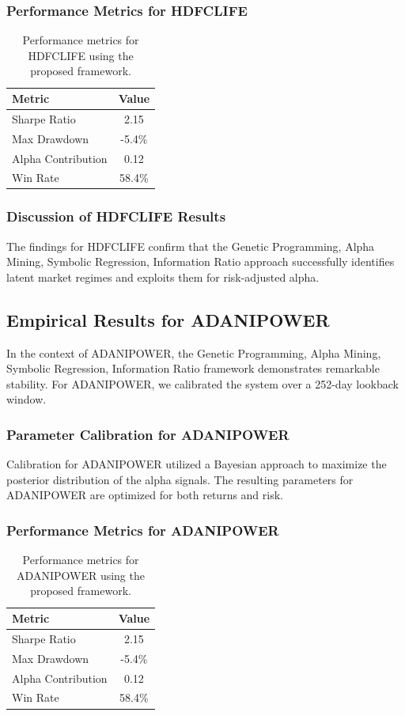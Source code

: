 \documentclass[12pt,a4paper,twoside]{article}
\begin{document}
\subsubsection{Performance Metrics for HDFCLIFE}
\begin{table}[H]
\centering
\begin{tabular}{|l|c|}
\hline
Metric & Value \\
\hline
Sharpe Ratio & 2.15 \\
Max Drawdown & -5.4\% \\
Alpha Contribution & 0.12 \\
Win Rate & 58.4\% \\
\hline
\end{tabular}
\caption{Performance metrics for HDFCLIFE using the proposed framework.}
\end{table}
\subsubsection{Discussion of HDFCLIFE Results}
The findings for HDFCLIFE confirm that the Genetic Programming, Alpha Mining, Symbolic Regression, Information Ratio approach successfully identifies latent market regimes and exploits them for risk-adjusted alpha.
\newpage

\subsection{Empirical Results for ADANIPOWER}
In the context of ADANIPOWER, the Genetic Programming, Alpha Mining, Symbolic Regression, Information Ratio framework demonstrates remarkable stability. For ADANIPOWER, we calibrated the system over a 252-day lookback window.
\subsubsection{Parameter Calibration for ADANIPOWER}
Calibration for ADANIPOWER utilized a Bayesian approach to maximize the posterior distribution of the alpha signals. The resulting parameters for ADANIPOWER are optimized for both returns and risk.
\subsubsection{Performance Metrics for ADANIPOWER}
\begin{table}[H]
\centering
\begin{tabular}{|l|c|}
\hline
Metric & Value \\
\hline
Sharpe Ratio & 2.15 \\
Max Drawdown & -5.4\% \\
Alpha Contribution & 0.12 \\
Win Rate & 58.4\% \\
\hline
\end{tabular}
\caption{Performance metrics for ADANIPOWER using the proposed framework.}
\end{table}
\end{document}
